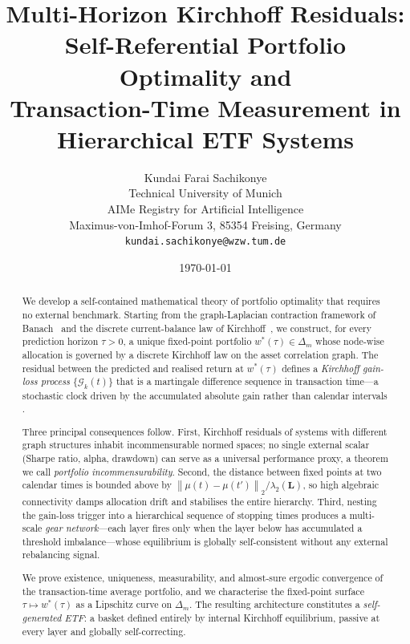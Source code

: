 \documentclass[twocolumn,11pt,a4paper]{article}
\title{%
  \large\bfseries
  Multi-Horizon Kirchhoff Residuals:\\
  Self-Referential Portfolio Optimality and\\
  Transaction-Time Measurement in Hierarchical ETF Systems%
}
\author{Kundai Farai Sachikonye\\[4pt]
\small Technical University of Munich\\
\small AIMe Registry for Artificial Intelligence\\
\small Maximus-von-Imhof-Forum 3, 85354 Freising, Germany\\
\small \texttt{kundai.sachikonye@wzw.tum.de}}
\date{\normalsize\today}
\theoremstyle{plain}
\theoremstyle{definition}
\theoremstyle{remark}
\newcommand{\Lop}{\mathbf{L}}        %
\newcommand{\wstar}{w^{*}}
\newcommand{\Deltam}{\Delta_m}
\newcommand{\lamtwo}{\lambda_2}
\newcommand{\norm}[1]{\left\|#1\right\|}
\newcommand{\Gain}{\mathcal{G}}
\newcommand{\GainK}{\Gain_{k}}
\begin{document}
\maketitle

\begin{abstract}
We develop a self-contained mathematical theory of portfolio optimality
that requires no external benchmark.  Starting from the graph-Laplacian
contraction framework of Banach~\cite{Banach1922} and the discrete
current-balance law of Kirchhoff~\cite{Kirchhoff1847}, we construct, for
every prediction horizon $\tau>0$, a unique fixed-point portfolio
$\wstar(\tau)\in\Deltam$ whose node-wise allocation is governed by a
discrete Kirchhoff law on the asset correlation graph.  The residual
between the predicted and realised return at $\wstar(\tau)$ defines a
\emph{Kirchhoff gain-loss process} $\{\GainK(t)\}$ that is a
martingale difference sequence in transaction time---a stochastic clock
driven by the accumulated absolute gain rather than calendar intervals
\cite{Clark1973}.

Three principal consequences follow.  First, Kirchhoff residuals of
systems with different graph structures inhabit incommensurable normed
spaces; no single external scalar (Sharpe ratio, alpha, drawdown) can
serve as a universal performance proxy, a theorem we call \emph{portfolio
incommensurability}.  Second, the distance between fixed points at two
calendar times is bounded above by $\norm{\mu(t)-\mu(t')}_2/\lamtwo(\Lop)$,
so high algebraic connectivity damps allocation drift and stabilises the
entire hierarchy.  Third, nesting the gain-loss trigger into a
hierarchical sequence of stopping times produces a multi-scale
\emph{gear network}---each layer fires only when the layer below has
accumulated a threshold imbalance---whose equilibrium is globally
self-consistent without any external rebalancing signal.

We prove existence, uniqueness, measurability, and almost-sure ergodic
convergence of the transaction-time average portfolio, and we
characterise the fixed-point surface $\tau\mapsto\wstar(\tau)$ as a
Lipschitz curve on $\Deltam$.  The resulting architecture constitutes a
\emph{self-generated ETF}: a basket defined entirely by internal
Kirchhoff equilibrium, passive at every layer and globally
self-correcting.
\end{abstract}

\tableofcontents
\newpage
\end{document}
